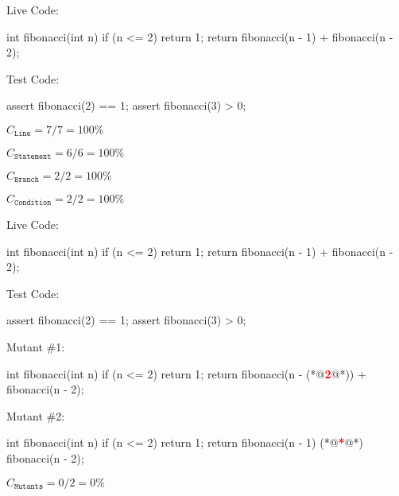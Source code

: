\documentclass{article}
\begin{document}

\begin{multicols}{2}
Live Code:\par
{\small\begin{ffcode}
int fibonacci(int n) {
  if (n <= 2) {
    return 1;
  }
  return fibonacci(n - 1)
    + fibonacci(n - 2);
}
\end{ffcode}
}
\par\columnbreak\par
Test Code:\par
{\small\begin{ffcode}
assert fibonacci(2) == 1;
assert fibonacci(3) > 0;
\end{ffcode}
}
\( C_{\texttt{Line}} = 7/7 = 100\% \)\par
\( C_{\texttt{Statement}} = 6/6 = 100\% \)\par
\( C_{\texttt{Branch}} = 2/2 = 100\% \)\par
\( C_{\texttt{Condition}} = 2/2 = 100\% \)\par
\end{multicols}
\plush{}

\begin{pptWide}{3}
Live Code:\par
{\small\begin{ffcode}
int fibonacci(int n) {
  if (n <= 2) {
    return 1;
  }
  return fibonacci(n - 1)
    + fibonacci(n - 2);
}
\end{ffcode}
}
\par
Test Code:\par
{\small\begin{ffcode}
assert fibonacci(2) == 1;
assert fibonacci(3) > 0;
\end{ffcode}
}
\par\columnbreak\par
Mutant \#1:\par
{\small\begin{ffcode}
int fibonacci(int n) {
  if (n <= 2) {
    return 1;
  }
  return fibonacci(n - (*@\textcolor{red}{\textbf{2}}@*))
    + fibonacci(n - 2);
}
\end{ffcode}
}
\par\columnbreak\par
Mutant \#2:\par
{\small\begin{ffcode}
int fibonacci(int n) {
  if (n <= 2) {
    return 1;
  }
  return fibonacci(n - 1)
    (*@\textcolor{red}{\textbf{*}}@*) fibonacci(n - 2);
}
\end{ffcode}
}
\par
\( C_{\texttt{Mutants}} = 0/2 = 0\% \)\par
\end{pptWide}
\plush{}
\end{document}
